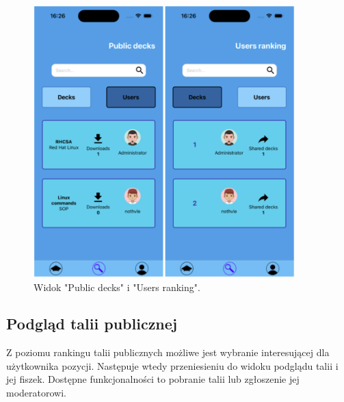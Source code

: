 \begin{figure}[H]
    \centering
    \includegraphics[width=0.9\textwidth]{chapters/chapter_10/images_mobile/mobile_ranking}
    \caption{Widok "Public decks" i "Users ranking".}
    \label{img:mobile_ranking}
\end{figure}


\subsection{Podgląd talii publicznej}
Z poziomu rankingu talii publicznych możliwe jest wybranie interesującej dla użytkownika pozycji. Następuje wtedy przeniesieniu do widoku podglądu talii i jej fiszek. Dostępne funkcjonalności to pobranie talii lub zgłoszenie jej moderatorowi.


